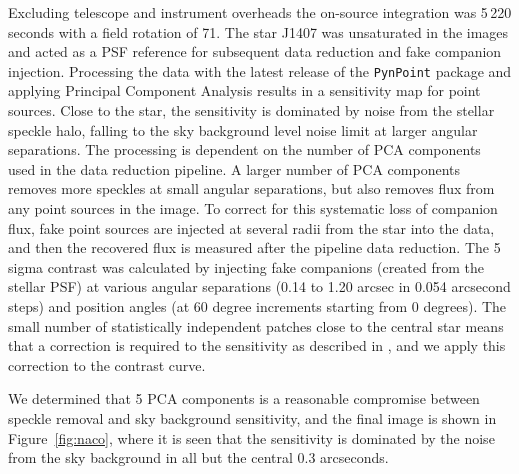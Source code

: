\documentclass[twocolumn]{aa} %
\begin{document}
Excluding telescope and instrument overheads the on-source integration was 5\,220 seconds with a field rotation of 71.
%
The star J1407 was unsaturated in the images and acted as a PSF reference for subsequent data reduction and fake companion injection.
%
Processing the data with the latest release of the \texttt{PynPoint} package \citep{Stolker19} and applying Principal Component Analysis \citep[PCA; ][]{Amara12} results in a sensitivity map for point sources.
%
Close to the star, the sensitivity is dominated by noise from the stellar speckle halo, falling to the sky background level noise limit at larger angular separations.
%
The processing is dependent on the number of PCA components used in the data reduction pipeline.
%
A larger number of PCA components removes more speckles at small angular separations, but also removes flux from any point sources in the image.
%
To correct for this systematic loss of companion flux, fake point sources are injected at several radii from the star into the data, and then the recovered flux is measured after the pipeline data reduction.
%
The 5 sigma contrast was calculated by injecting fake companions (created from the stellar PSF) at various angular separations (0.14 to 1.20 arcsec in 0.054 arcsecond steps) and position angles (at 60 degree increments starting from 0 degrees).
%
The small number of statistically independent patches close to the central star means that a correction is required to the sensitivity as described in \citet{Mawet14}, and we apply this correction to the contrast curve.

We determined that 5 PCA components is a reasonable compromise between speckle removal and sky background sensitivity, and the final image is shown in Figure~\ref{fig:naco}, where it is seen that the sensitivity is dominated by the noise from the sky background in all but the central 0.3 arcseconds.
\end{document}
